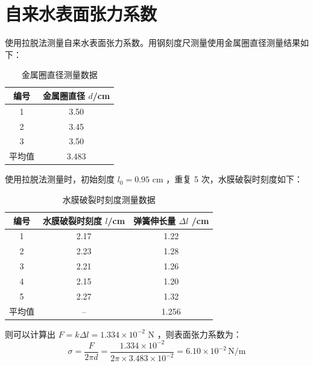 \documentclass[a4paper]{extarticle}
\begin{document}
    \section{自来水表面张力系数}
    使用拉脱法测量自来水表面张力系数。用钢刻度尺测量使用金属圈直径测量结果如下：
    \begin{table}[H]
        \centering
        \caption{金属圈直径测量数据}
        \begin{tabular}{cc}
            \toprule
            编号 & 金属圈直径 $d$/cm\\
            \midrule
            1 & 3.50\\
            2 & 3.45\\
            3 & 3.50\\
            \midrule
            平均值 & 3.483\\
            \bottomrule
        \end{tabular}
    \end{table}
    使用拉脱法测量时，初始刻度 $l_0 = 0.95$ cm ，重复 5 次，水膜破裂时刻度如下：
    \begin{table}[H]
        \centering
        \caption{水膜破裂时刻度测量数据}
        \begin{tabular}{ccc}
            \toprule
            编号 & 水膜破裂时刻度 $l$/cm & 弹簧伸长量 $\Delta l$ /cm\\
            \midrule
            1 & 2.17 & 1.22\\
            2 & 2.23 & 1.28\\
            3 & 2.21 & 1.26\\
            4 & 2.15 & 1.20\\
            5 & 2.27 & 1.32\\
            \midrule
            平均值 & -- & 1.256\\
            \bottomrule
        \end{tabular}
    \end{table}
    则可以计算出 $F=k\Delta l=1.334\times10^{-2}$ N ，则表面张力系数为：
    \begin{equation*}
        \sigma=\frac{F}{2\pi d}=\frac{1.334\times10^{-2}}{2\pi \times3.483\times10^{-2}}=6.10\times10^{-2} \,\text{N/m}    
    \end{equation*}
\end{document}

